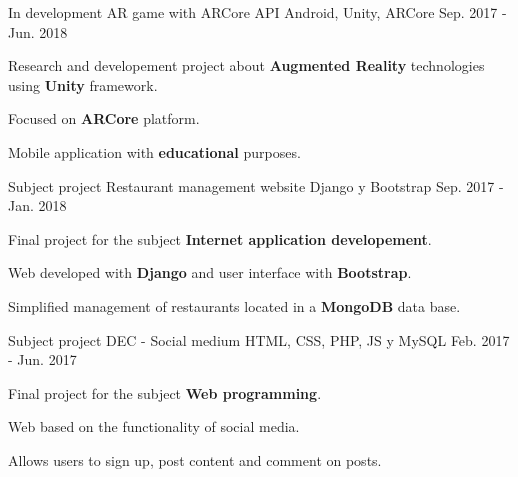 

\begin{cventries}

  \cventry
    {{In development}} %
    {AR game with ARCore API} %
    {Android, Unity, ARCore} %
    {Sep. 2017 - Jun. 2018} %
    {
      \begin{cvitems} %
        \item {Research and developement project about \textbf{Augmented Reality} technologies using \textbf{Unity} framework.}
        \item {Focused on \textbf{ARCore} platform.}
        \item {Mobile application with \textbf{educational} purposes.}
      \end{cvitems}
    }

  \cventry
    {{Subject project}} %
    {Restaurant management website} %
    {Django y Bootstrap} %
    {Sep. 2017 - Jan. 2018} %
    {
      \begin{cvitems} %
        \item {Final project for the subject \textbf{Internet application developement}.}
        \item {Web developed with \textbf{Django} and user interface with \textbf{Bootstrap}.}
        \item {Simplified management of restaurants located in a \textbf{MongoDB} data base.}
      \end{cvitems}
    }

  \cventry
    {{Subject project}} %
    {DEC - Social medium} %
    {HTML, CSS, PHP, JS y MySQL} %
    {Feb. 2017 - Jun. 2017} %
    {
      \begin{cvitems} %
        \item {Final project for the subject \textbf{Web programming}.}
        \item {Web based on the functionality of social media.}
        \item {Allows users to sign up, post content and comment on posts.}
      \end{cvitems}
    }


\end{cventries}

